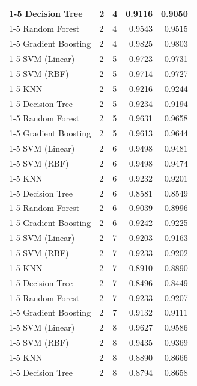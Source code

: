 \begin{table}
\begin{tabular}{lllrr}
\cline{1-5} \cline{2-5}
Decision Tree & 2 & 4 & 0.9116 & 0.9050 \\
\cline{1-5} \cline{2-5}
Random Forest & 2 & 4 & 0.9543 & 0.9515 \\
\cline{1-5} \cline{2-5}
Gradient Boosting & 2 & 4 & 0.9825 & 0.9803 \\
\cline{1-5} \cline{2-5}
SVM (Linear) & 2 & 5 & 0.9723 & 0.9731 \\
\cline{1-5} \cline{2-5}
SVM (RBF) & 2 & 5 & 0.9714 & 0.9727 \\
\cline{1-5} \cline{2-5}
KNN & 2 & 5 & 0.9216 & 0.9244 \\
\cline{1-5} \cline{2-5}
Decision Tree & 2 & 5 & 0.9234 & 0.9194 \\
\cline{1-5} \cline{2-5}
Random Forest & 2 & 5 & 0.9631 & 0.9658 \\
\cline{1-5} \cline{2-5}
Gradient Boosting & 2 & 5 & 0.9613 & 0.9644 \\
\cline{1-5} \cline{2-5}
SVM (Linear) & 2 & 6 & 0.9498 & 0.9481 \\
\cline{1-5} \cline{2-5}
SVM (RBF) & 2 & 6 & 0.9498 & 0.9474 \\
\cline{1-5} \cline{2-5}
KNN & 2 & 6 & 0.9232 & 0.9201 \\
\cline{1-5} \cline{2-5}
Decision Tree & 2 & 6 & 0.8581 & 0.8549 \\
\cline{1-5} \cline{2-5}
Random Forest & 2 & 6 & 0.9039 & 0.8996 \\
\cline{1-5} \cline{2-5}
Gradient Boosting & 2 & 6 & 0.9242 & 0.9225 \\
\cline{1-5} \cline{2-5}
SVM (Linear) & 2 & 7 & 0.9203 & 0.9163 \\
\cline{1-5} \cline{2-5}
SVM (RBF) & 2 & 7 & 0.9233 & 0.9202 \\
\cline{1-5} \cline{2-5}
KNN & 2 & 7 & 0.8910 & 0.8890 \\
\cline{1-5} \cline{2-5}
Decision Tree & 2 & 7 & 0.8496 & 0.8449 \\
\cline{1-5} \cline{2-5}
Random Forest & 2 & 7 & 0.9233 & 0.9207 \\
\cline{1-5} \cline{2-5}
Gradient Boosting & 2 & 7 & 0.9132 & 0.9111 \\
\cline{1-5} \cline{2-5}
SVM (Linear) & 2 & 8 & 0.9627 & 0.9586 \\
\cline{1-5} \cline{2-5}
SVM (RBF) & 2 & 8 & 0.9435 & 0.9369 \\
\cline{1-5} \cline{2-5}
KNN & 2 & 8 & 0.8890 & 0.8666 \\
\cline{1-5} \cline{2-5}
Decision Tree & 2 & 8 & 0.8794 & 0.8658 \\

\end{tabular}
\end{table}
